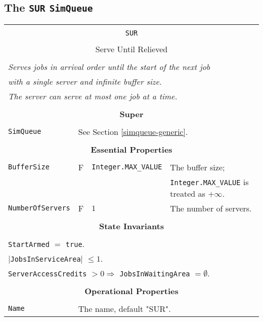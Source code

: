 \documentclass[12pt]{book}
\begin{document}
\subsection{The \lstinline{SUR} \lstinline{SimQueue}}

\begin{tabular}{|l|l|l|l|}
\hline
\multicolumn{4}{|c|}{} \\
\multicolumn{4}{|c|}{\lstinline[basicstyle=\large]{SUR}} \\
\multicolumn{4}{|c|}{} \\
\multicolumn{4}{|c|}{Serve Until Relieved} \\
\multicolumn{4}{|c|}{} \\
\hline
\multicolumn{4}{|l|}{\em Serves jobs in arrival order until the start of the next job} \\
\multicolumn{4}{|l|}{\em with a single server and infinite buffer size.} \\
\multicolumn{4}{|l|}{\em The server can serve at most one job at a time.} \\
\hline
\multicolumn{4}{|c|}{} \\
\multicolumn{4}{|c|}{\bf Super} \\
\multicolumn{4}{|c|}{} \\
\hline
\lstinline|SimQueue| & \multicolumn{3}{|l|}{See Section \ref{simqueue-generic}.} \\
\hline
\multicolumn{4}{|c|}{} \\
\multicolumn{4}{|c|}{\bf Essential Properties} \\
\multicolumn{4}{|c|}{} \\
\hline
\lstinline|BufferSize|      & F & \lstinline|Integer.MAX_VALUE|
                            & The buffer size; \\
                        & & & \lstinline|Integer.MAX_VALUE| is treated as $+\infty$. \\
\hline
\lstinline|NumberOfServers| & F & $1$
                            & The number of servers. \\
\hline
\multicolumn{4}{|c|}{} \\
\multicolumn{4}{|c|}{\bf State  Invariants} \\
\multicolumn{4}{|c|}{} \\
\hline
\multicolumn{4}{|l|}{\lstinline|StartArmed| $=$ \lstinline|true|.} \\
\multicolumn{4}{|l|}{$|$\lstinline|JobsInServiceArea|$|$ $\leq 1$.} \\
\multicolumn{4}{|l|}{\lstinline|ServerAccessCredits| $> 0 \Rightarrow$ \lstinline|JobsInWaitingArea| $= \emptyset$.} \\
\hline
\multicolumn{4}{|c|}{} \\
\multicolumn{4}{|c|}{\bf Operational Properties} \\
\multicolumn{4}{|c|}{} \\
\hline
\lstinline|Name| & \multicolumn{3}{|l|}{The name, default "SUR".} \\
\hline
\end{tabular}
\end{document}
